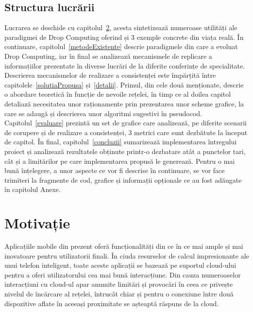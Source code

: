 \documentclass[12pt,a4paper]{report}
\begin{document}
\section{Structura lucrării}
Lucrarea se deschide cu capitolul~\ref{motivatie}, acesta sintetizează numeroase utilități ale paradigmei de Drop Computing oferind și 3 exemple concrete din viața reală. În continuare, capitolul~\ref{metodeExistente} descrie paradigmele din care a evoluat Drop Computing, iar în final se analizează mecanismele de replicare a informațiilor prezentate în diverse lucrări de la diferite conferințe de specialitate. Descrierea mecanismelor de realizare a consistenței este împărțită între capitolele~\ref{solutiaPropusa} și~\ref{detalii}. Primul, din cele două menționate, descrie o abordare teoretică în funcție de nevoile rețelei, în timp ce al doilea capitol detaliază necesitatea unor raționamente prin prezentarea unor scheme grafice, la care se adaugă și descrierea unor algoritmi sugestivi în pseudocod. Capitolul~\ref{evaluare} prezintă un set de grafice care analizează, pe diferite scenarii de corupere și de realizare a consistenței, 3 metrici care sunt dezbătute la început de capitol.
În final, capitolul~\ref{concluzii} sumarizează implementarea întregului proiect și analizează rezultatele obținute printr-o dezbatare atât a punctelor tari, cât și a limitărilor pe care implementarea propusă le generează. Pentru o mai bună înțelegere, a unor aspecte ce vor fi descrise în continuare, se vor face trimiteri la fragmente de cod, grafice și informații opționale ce au fost adăugate în capitolul Anexe. 


\chapter{Motivație} \label{motivatie}

Aplicațiile mobile din prezent oferă funcționalități din ce în ce mai ample și mai inovatoare pentru utilizatorii finali. În ciuda resurselor de calcul impresionante ale unui telefon inteligent, toate aceste aplicații se bazează pe suportul cloud-ului pentru a oferi utilizatorului cea mai bună interacțiune. Din cauza numeroaselor interacțiuni cu cloud-ul apar anumite limitări și provocări în ceea ce privește nivelul de încărcare al rețelei, întrucât chiar și pentru o conexiune între două dispozitive aflate în aceeași proximitate se așteaptă răspuns de la cloud.
\end{document}
